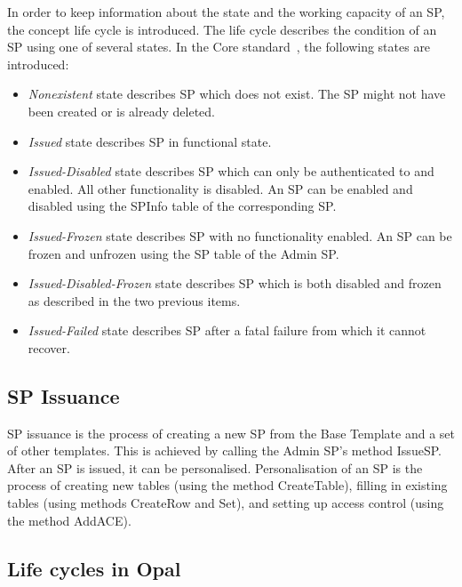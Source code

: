 In order to keep information about the state and the working capacity of an SP, the concept life cycle is introduced. The life cycle describes the condition of an SP using one of several states. In the Core standard~\cite{tcg-storage-core}, the following states are introduced: 
\begin{itemize}
\item \emph{Nonexistent} state describes SP which does not exist. The SP might not have been created or is already deleted.
\item \emph{Issued} state describes SP in functional state.
\item \emph{Issued-Disabled} state describes SP which can only be authenticated to and enabled. All other functionality is disabled. An SP can be enabled and disabled using the SPInfo table of the corresponding SP.
\item \emph{Issued-Frozen} state describes SP with no functionality enabled. An SP can be frozen and unfrozen using the SP table of the Admin SP.
\item \emph{Issued-Disabled-Frozen} state describes SP which is both disabled and frozen as described in the two previous items.
\item \emph{Issued-Failed} state describes SP after a fatal failure from which it cannot recover.
\end{itemize}


\subsection{SP Issuance}

SP issuance is the process of creating a new SP from the Base Template and a set of other templates. This is achieved by calling the Admin SP's method IssueSP. After an SP is issued, it can be personalised. Personalisation of an SP is the process of creating new tables (using the method CreateTable), filling in existing tables (using methods CreateRow and Set), and setting up access control (using the method AddACE).

\subsection{Life cycles in Opal}

